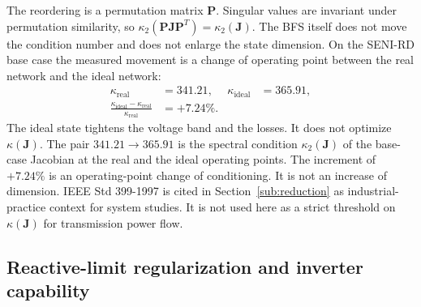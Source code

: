 The reordering is a permutation matrix $\mathbf{P}$. Singular values are invariant under permutation similarity, so $\kappa_2(\mathbf{P}\mathbf{J}\mathbf{P}^{T})=\kappa_2(\mathbf{J})$. The BFS itself does not move the condition number and does not enlarge the state dimension. On the SENI-RD base case the measured movement is a change of operating point between the real network and the ideal network:
\begin{equation}
\begin{aligned}
\kappa_{\mathrm{real}} &= 341.21, &
\kappa_{\mathrm{ideal}} &= 365.91, \\
\frac{\kappa_{\mathrm{ideal}}-\kappa_{\mathrm{real}}}{\kappa_{\mathrm{real}}}
&= +7.24\%.
\end{aligned}
\label{eq:bfs}
\end{equation}
The ideal state tightens the voltage band and the losses. It does not optimize $\kappa(\mathbf{J})$. The pair $341.21 \to 365.91$ is the spectral condition $\kappa_2(\mathbf{J})$ of the base-case Jacobian at the real and the ideal operating points. The increment of $+7.24\%$ is an operating-point change of conditioning. It is not an increase of dimension. IEEE Std 399-1997 \cite{ieee399} is cited in Section~\ref{sub:reduction} as industrial-practice context for system studies. It is not used here as a strict threshold on $\kappa(\mathbf{J})$ for transmission power flow.

\subsection{Reactive-limit regularization and inverter capability}
\label{sub:regularization}

